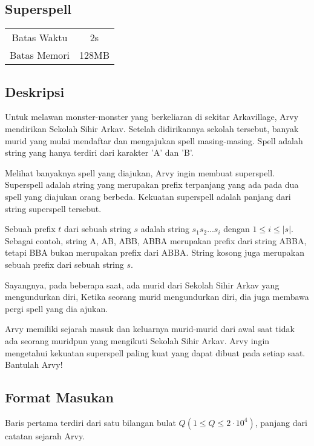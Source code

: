 \documentclass{article}
\begin{document}
\begin{center}
    \section*{Superspell} %

    \begin{tabular}{ | c c | }
        \hline
        Batas Waktu  & 2s \\    %
        Batas Memori & 128MB \\  %
        \hline
    \end{tabular}
\end{center}

\subsection*{Deskripsi}
Untuk melawan monster-monster yang berkeliaran di sekitar Arkavillage, Arvy mendirikan Sekolah Sihir Arkav. Setelah didirikannya sekolah tersebut, banyak murid yang mulai mendaftar dan mengajukan spell masing-masing. Spell adalah string yang hanya terdiri dari karakter 'A' dan 'B'.

Melihat banyaknya spell yang diajukan, Arvy ingin membuat superspell. Superspell adalah string yang merupakan prefix terpanjang yang ada pada dua spell yang diajukan orang berbeda. Kekuatan superspell adalah panjang dari string superspell tersebut.

Sebuah prefix $t$ dari sebuah string $s$ adalah string $s_1s_2...s_i$ dengan $1 \leq i \leq |s|$. Sebagai contoh, string A, AB, ABB, ABBA merupakan prefix dari string ABBA, tetapi BBA bukan merupakan prefix dari ABBA. String kosong juga merupakan sebuah prefix dari sebuah string $s$.

Sayangnya, pada beberapa saat, ada murid dari Sekolah Sihir Arkav yang mengundurkan diri, Ketika seorang murid mengundurkan diri, dia juga membawa pergi spell yang dia ajukan.

Arvy memiliki sejarah masuk dan keluarnya murid-murid dari awal saat tidak ada seorang muridpun yang mengikuti Sekolah Sihir Arkav.
Arvy ingin mengetahui kekuatan superspell paling kuat yang dapat dibuat pada setiap saat. Bantulah Arvy!

\subsection*{Format Masukan}
Baris pertama terdiri dari satu bilangan bulat $Q (1 \leq Q \leq 2\cdot10^4)$, panjang dari catatan sejarah Arvy. 
\end{document}
